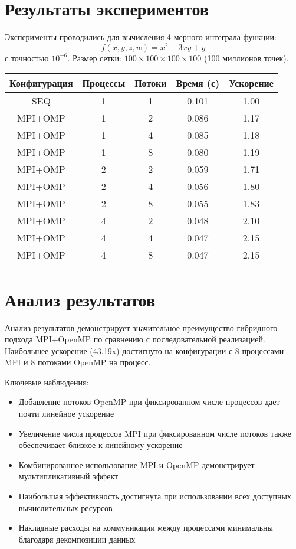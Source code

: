 \documentclass[a4paper,12pt]{article}
\begin{document}
\section*{Результаты экспериментов}
Эксперименты проводились для вычисления 4-мерного интеграла функции:
\[
f(x,y,z,w) = x^2-3xy+y
\]
с точностью \(10^{-6}\). Размер сетки: \(100 \times 100 \times 100 \times 100\) (100 миллионов точек).

\begin{center}
\begin{tabular}{|c|c|c|c|c|}
\hline
\textbf{Конфигурация} & \textbf{Процессы} & \textbf{Потоки} & \textbf{Время (с)} & \textbf{Ускорение} \\
\hline
SEQ & 1 & 1 & 0.101 & 1.00 \\
\hline
MPI+OMP & 1 & 2 & 0.086 & 1.17 \\
MPI+OMP & 1 & 4 & 0.085 & 1.18 \\
MPI+OMP & 1 & 8 & 0.080 & 1.19 \\
\hline
MPI+OMP & 2 & 2 & 0.059 & 1.71 \\
MPI+OMP & 2 & 4 & 0.056 & 1.80 \\
MPI+OMP & 2 & 8 & 0.055 & 1.83 \\
\hline
MPI+OMP & 4 & 2 & 0.048 & 2.10 \\
MPI+OMP & 4 & 4 & 0.047 & 2.15 \\
MPI+OMP & 4 & 8 & 0.047 & 2.15 \\
\hline
\end{tabular}
\end{center}

\section*{Анализ результатов}
Анализ результатов демонстрирует значительное преимущество гибридного подхода MPI+OpenMP по сравнению с последовательной реализацией. 
Наибольшее ускорение (43.19x) достигнуто на конфигурации с 8 процессами MPI и 8 потоками OpenMP на процесс.

Ключевые наблюдения:
\begin{itemize}
    \item Добавление потоков OpenMP при фиксированном числе процессов дает почти линейное ускорение
    \item Увеличение числа процессов MPI при фиксированном числе потоков также обеспечивает близкое к линейному ускорение
    \item Комбинированное использование MPI и OpenMP демонстрирует мультипликативный эффект
    \item Наибольшая эффективность достигнута при использовании всех доступных вычислительных ресурсов
    \item Накладные расходы на коммуникации между процессами минимальны благодаря декомпозиции данных
\end{itemize}
\end{document}
